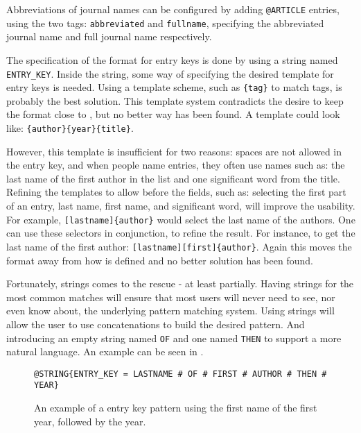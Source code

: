 Abbreviations of journal names can be configured by adding
\texttt{@ARTICLE} entries, using the two tags: \texttt{abbreviated}
and \texttt{fullname}, specifying the abbreviated journal name and
full journal name respectively.

The specification of the format for entry keys is done by using a
{\bibtex} string named \texttt{ENTRY\_KEY}.  Inside
the string, some way of specifying the desired template for entry keys
is needed.  Using a template scheme, such as \texttt{\{tag\}} to match
tags, is probably the best solution.  This template system contradicts
the desire to keep the format close to {\bibtex}, but no better way
has been found.  A template could look like:
\texttt{\{author\}\{year\}\{title\}}.

However, this template is insufficient for two reasons: spaces are not
allowed in the entry key, and when people name entries, they often use
names such as: the last name of the first author in the list and one
significant word from the title.  Refining the templates to allow
 before the fields, such as: selecting the first
part of an entry, last name, first name, and significant word, will
improve the usability.  For example, \texttt{[lastname]\{author\}}
would select the last name of the authors.  One can use these
selectors in conjunction, to refine the result.  For instance, to get
the last name of the first author:
\texttt{[lastname][first]\{author\}}.  Again this moves the format
away from how {\bibtex} is defined and no better solution has been
found.

Fortunately, {\bibtex} strings comes to the rescue - at least
partially.  Having strings for the most common matches will ensure
that most users will never need to see, nor even know about, the
underlying pattern matching system.  Using strings will allow the user
to use concatenations to build the desired pattern.  And introducing
an empty string named \texttt{OF} and one named \texttt{THEN} to
support a more natural language.  An example can be seen in
.

\begin{figure}
  \centering
\begin{small}
\begin{verbatim}
@STRING{ENTRY_KEY = LASTNAME # OF # FIRST # AUTHOR # THEN # YEAR}
\end{verbatim}
\end{small}
\caption{An example of a entry key pattern using the first name of
    the first year, followed by the year.}
\label{fig:analyzing_entry_key_pattern}
\end{figure}

